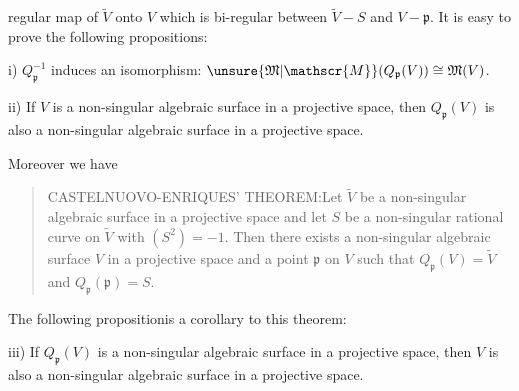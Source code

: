 regular map of $\widetilde{V}$ onto $V$ which is bi-regular between $\widetilde{V}-S$ and $V-\mathfrak{p}$. It is easy to prove the following propositions:\footnotemark[4]

i) $Q_{\mathfrak{p}}^{-1}$ induces an isomorphism: $\unsure{\mathfrak{M}|\mathscr{M}}(Q_{\mathfrak{p}}(V))\cong\mathfrak{M}(V)$.

ii) If $V$ is a non-singular algebraic surface in a projective space, then $Q_{\mathfrak{p}}(V)$ is also a non-singular algebraic surface in a projective space.

Moreover we have

\begin{quote}
CASTELNUOVO-ENRIQUES' THEOREM:\footnotemark[5] Let $\widetilde{V}$ be a non-singular algebraic surface in a projective space and let $S$ be a non-singular rational curve on $\widetilde{V}$ with $(S^{2})=-1$. Then there exists a non-singular algebraic surface $V$ in a projective space and a point $\mathfrak{p}$ on $V$ such that $Q_{\mathfrak{p}}(V)=\widetilde{V}$ and $Q_{\mathfrak{p}}(\mathfrak{p})=S$.
\end{quote}

The following proposition\footnotemark[6] is a corollary to this theorem:

iii) If $Q_{\mathfrak{p}}(V)$ is a non-singular algebraic surface in a projective space, then $V$ is also a non-singular algebraic surface in a projective space.
